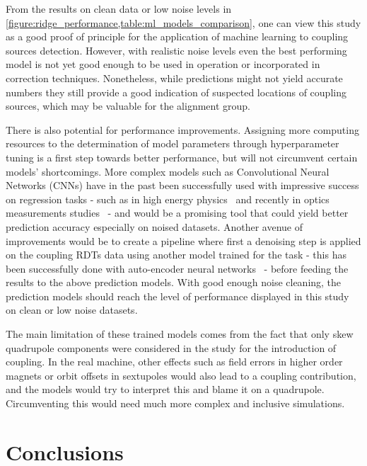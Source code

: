 From the results on clean data or low noise levels in \cref{figure:ridge_performance,table:ml_models_comparison}, one can view this study as a good proof of principle for the application of machine learning to coupling sources detection.
However, with realistic noise levels even the best performing model is not yet good enough to be used in operation or incorporated in correction techniques.
Nonetheless, while predictions might not yield accurate numbers they still provide a good indication of suspected locations of coupling sources, which may be valuable for the alignment group.

There is also potential for performance improvements.
Assigning more computing resources to the determination of model parameters through hyperparameter tuning is a first step towards better performance, but will not circumvent certain models' shortcomings.
More complex models such as Convolutional Neural Networks (CNNs) have in the past been successfully used with impressive success on regression tasks - such as in high energy physics~\cite{JOI:Aurisano:Convolutional_Neural_Network_Neutrino_Event_Classifier} and recently in optics measurements studies~\cite{IPAC:Fol:Optics_Corrections_Using_Machine_Learning_in_the_LHC} - and would be a promising tool that could yield better prediction accuracy especially on noised datasets.
Another avenue of improvements would be to create a pipeline where first a denoising step is applied on the coupling RDTs data using another model trained for the task - this has been successfully done with auto-encoder neural networks~\cite{IPAC:Fol:Denoising_Optics_Measurements_Autoencoder_Neural_Networks} - before feeding the results to the above prediction models.
With good enough noise cleaning, the prediction models should reach the level of performance displayed in this study on clean or low noise datasets.

The main limitation of these trained models comes from the fact that only skew quadrupole components were considered in the study for the introduction of coupling.
In the real machine, other effects such as field errors in higher order magnets or orbit offsets in sextupoles would also lead to a coupling contribution, and the models would try to interpret this and blame it on a quadrupole.
Circumventing this would need much more complex and inclusive simulations.

\section{Conclusions}
\label{section:ml_conclusions_outlooks}

